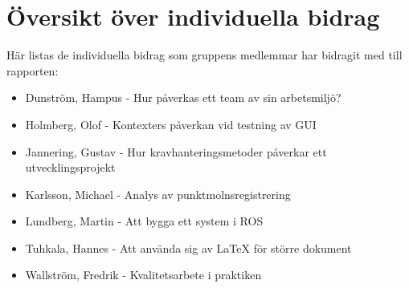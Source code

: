 \section{Översikt över individuella bidrag}

Här listas de individuella bidrag som gruppens medlemmar har bidragit med till rapporten:

\begin{itemize}
	\item Dunström, Hampus - Hur påverkas ett team av sin arbetsmiljö?
	\item Holmberg, Olof - Kontexters påverkan vid testning av GUI
	\item Jannering, Gustav - Hur kravhanteringsmetoder påverkar ett utvecklingsprojekt
	\item Karlsson, Michael - Analys av punktmolnsregistrering
	\item Lundberg, Martin - Att bygga ett system i ROS
	\item Tuhkala, Hannes - Att använda sig av LaTeX för större dokument
	\item Wallström, Fredrik - Kvalitetsarbete i praktiken
\end{itemize}


